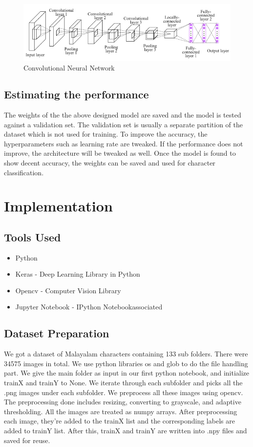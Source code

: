 \documentclass[12pt]{report}
\begin{document}
\begin{figure}[h]
    \centering
    \includegraphics[width=\textwidth]{cnn.png}
    \caption{Convolutional Neural Network}
\end{figure}

\subsection*{Estimating the performance}
The weights of the the above designed model are saved and the model is tested against a validation set. The validation set is usually a separate partition of the dataset which is not used for training. To improve the accuracy, the hyperparameters such as learning rate are tweaked. If the performance does not improve, the architecture will be tweaked as well. Once the model is found to show decent accuracy, the weights can be saved and used for character classification. 

\section*{Implementation}
\subsection*{Tools Used}
\begin{itemize}
\item Python
\item Keras - Deep Learning Library in Python
\item Opencv - Computer Vision Library
\item Jupyter Notebook - IPython Notebookassociated
\end{itemize}
\subsection*{Dataset Preparation}
We got a dataset of Malayalam characters containing 133 sub folders. There were 34575 images in total. We use python libraries os and glob to do the file handling part. We give the main folder as input in our first python notebook, and initialize trainX and trainY to None. We iterate through each subfolder and picks all the .png images under each subfolder. We preprocess all these images using opencv. The preprocessing done includes resizing, converting to grayscale, and adaptive thresholding. All the images are treated as numpy arrays. After preprocessing each image, they're added to the trainX list and the corresponding labels are added to trainY list. After this, trainX and trainY are written into .npy files and saved for reuse. 
\end{document}
